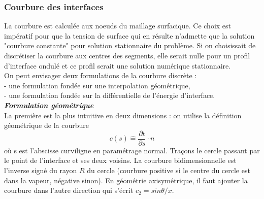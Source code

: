 \subsubsection{Courbure des interfaces}

La courbure est calcul\'ee aux noeuds du maillage surfacique. Ce choix est imp\'eratif pour que la tension de surface qui en r\'esulte n'admette que la solution "courbure constante" pour solution stationnaire du probl\`eme. Si on choisissait de discr\'etiser la courbure aux centres des segments, elle serait nulle pour un profil d'interface ondul\'e et ce profil serait une solution num\'erique stationnaire.\\
On peut envisager deux formulations de la courbure discr\`ete :\\
- une formulation fond\'ee sur une interpolation g\'eom\'etrique,\\
- une formulation fond\'ee sur la diff\'erentielle de l'\'energie d'interface.
\smallskip \\

\textit{\textbf{Formulation g\'eom\'etrique}}
\smallskip \\

La première est la plus intuitive en deux dimensions : on utilise la d\'efinition g\'eom\'etrique de la courbure
\begin{equation}
c(s) \hat{=} \frac{\partial t}{\partial s} \cdot n
\end{equation}
o\`u s est l'abscisse curviligne en param\'etrage normal. Tra\c cons le cercle passant par le point de l'interface et ses deux voisins. La courbure bidimensionnelle est l'inverse sign\'e du rayon $R$ du cercle (courbure positive si le centre du cercle est dans la vapeur, n\'egative sinon). En g\'eom\'etrie axisym\'etrique, il faut ajouter la courbure dans l'autre direction qui s'\'ecrit $c_{2} = sin \theta / x$.

